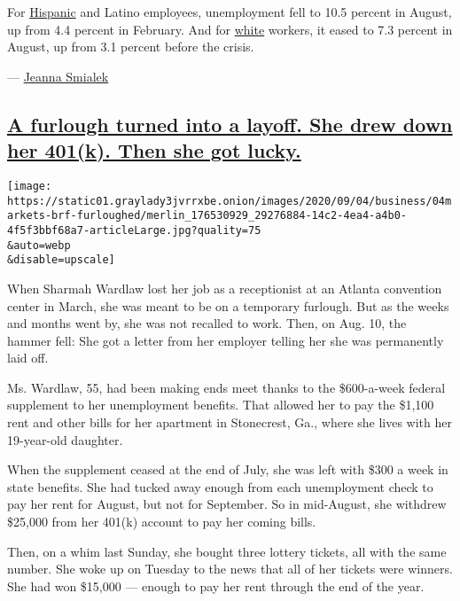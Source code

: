 For
\href{https://beta.bls.gov/dataViewer/view/timeseries/LNS14000009}{Hispanic}
and Latino employees, unemployment fell to 10.5 percent in August, up
from 4.4 percent in February. And for
\href{https://beta.bls.gov/dataViewer/view/timeseries/LNS14000003}{white}
workers, it eased to 7.3 percent in August, up from 3.1 percent before
the crisis.

--- \href{https://www.nytimes3xbfgragh.onion/by/jeanna-smialek}{Jeanna
Smialek}

\hypertarget{a-furlough-turned-into-a-layoff-she-drew-down-her-401k-then-she-got-lucky}{%
\subsection{\texorpdfstring{\protect\hyperlink{a-furlough-turned-into-a-layoff-she-drew-down-her-401-k-then-she-got-lucky}{A
furlough turned into a layoff. She drew down her 401(k). Then she got
lucky.}}{A furlough turned into a layoff. She drew down her 401(k). Then she got lucky.}}\label{a-furlough-turned-into-a-layoff-she-drew-down-her-401k-then-she-got-lucky}}

\texttt{[image: https://static01.graylady3jvrrxbe.onion/images/2020/09/04/business/04markets-brf-furloughed/merlin\_176530929\_29276884-14c2-4ea4-a4b0-4f5f3bbf68a7-articleLarge.jpg?quality=75\\\&auto=webp\\\&disable=upscale]}

When Sharmah Wardlaw lost her job as a receptionist at an Atlanta
convention center in March, she was meant to be on a temporary furlough.
But as the weeks and months went by, she was not recalled to work. Then,
on Aug. 10, the hammer fell: She got a letter from her employer telling
her she was permanently laid off.

Ms. Wardlaw, 55, had been making ends meet thanks to the \$600-a-week
federal supplement to her unemployment benefits. That allowed her to pay
the \$1,100 rent and other bills for her apartment in Stonecrest, Ga.,
where she lives with her 19-year-old daughter.

When the supplement ceased at the end of July, she was left with \$300 a
week in state benefits. She had tucked away enough from each
unemployment check to pay her rent for August, but not for September. So
in mid-August, she withdrew \$25,000 from her 401(k) account to pay her
coming bills.

Then, on a whim last Sunday, she bought three lottery tickets, all with
the same number. She woke up on Tuesday to the news that all of her
tickets were winners. She had won \$15,000 --- enough to pay her rent
through the end of the year.

